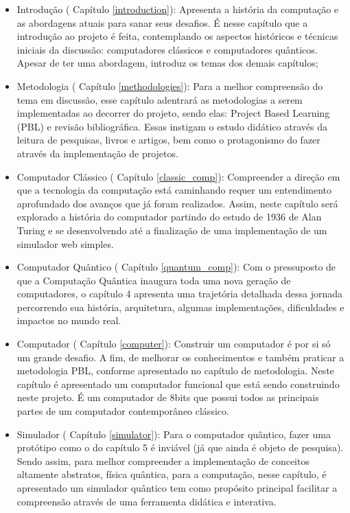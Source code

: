 \begin{itemize}
  \item Introdução ( Capítulo \ref{introduction}): Apresenta a história da computação e as abordagens atuais para sanar seus desafios. É nesse capítulo que a introdução ao projeto é feita, contemplando os aspectos históricos e técnicas iniciais da discussão: computadores clássicos e computadores quânticos. Apesar de ter uma abordagem, introduz os temas dos demais capítulos;
  \item Metodologia ( Capítulo \ref{methodologies}): Para a melhor compreensão do tema em discussão, esse capítulo adentrará as metodologias a serem implementadas ao decorrer do projeto, sendo elas: Project Based Learning (PBL) e revisão bibliográfica. Essas instigam o estudo didático através da leitura de pesquisas, livros e artigos, bem como o protagonismo do fazer através da implementação de projetos.
  \item Computador Clássico ( Capítulo \ref{classic_comp}): Compreender a direção em que a tecnologia da computação está caminhando requer um entendimento aprofundado dos avanços que já foram realizados. Assim, neste capítulo será explorado a história do computador partindo do estudo de 1936 de Alan Turing e se desenvolvendo até a finalização de uma implementação de um simulador web simples.
  \item Computador Quântico ( Capítulo \ref{quantum_comp}): Com o pressuposto de que a Computação Quântica inaugura toda uma nova geração de computadores, o capítulo 4 apresenta uma trajetória detalhada dessa jornada percorrendo sua história, arquitetura, algumas implementações, dificuldades e impactos no mundo real.
  \item Computador ( Capítulo \ref{computer}): Construir um computador é por si só um grande desafio. A fim, de melhorar os conhecimentos e também praticar a metodologia PBL, conforme apresentado no capítulo de metodologia. Neste capítulo é apresentado um computador funcional que está sendo construindo neste projeto. É um computador de 8bits que possui todos as principais partes de um computador contemporâneo clássico.
  \item Simulador ( Capítulo \ref{simulator}): Para o computador quântico, fazer uma protótipo como o do capítulo 5 é inviável (já que ainda é objeto de pesquisa). Sendo assim, para melhor compreender a implementação de conceitos altamente abstratos, física quântica, para a computação, nesse capítulo, é apresentado um simulador quântico tem como propósito principal facilitar a compreensão através de uma ferramenta didática e interativa.

\end{itemize}
